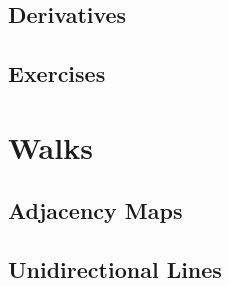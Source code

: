 \subsection{Derivatives}
\subsection{Exercises}

\newpage
\section{Walks}
\noindent{}
\subsection{Adjacency Maps}
\subsection{Unidirectional Lines}
